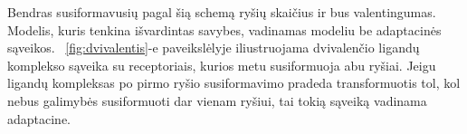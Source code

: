 \documentclass[10pt]{article}
\begin{document}
           
Bendras susiformavusių pagal šią schemą ryšių skaičius  ir bus valentingumas. Modelis, kuris tenkina išvardintas savybes, vadinamas modeliu  be adaptacinės sąveikos. ~\ref{fig:dvivalentis}-e paveikslėlyje  iliustruojama dvivalenčio ligandų komplekso sąveika su receptoriais, kurios metu susiformuoja  abu ryšiai. Jeigu ligandų kompleksas po pirmo ryšio susiformavimo pradeda transformuotis tol, kol nebus galimybės susiformuoti dar vienam ryšiui, tai tokią sąveiką vadinama  adaptacine.  
          

\begin{figure}[h!]
\end{figure}

\begin{figure}[h!]
\end{figure}
\end{document}
